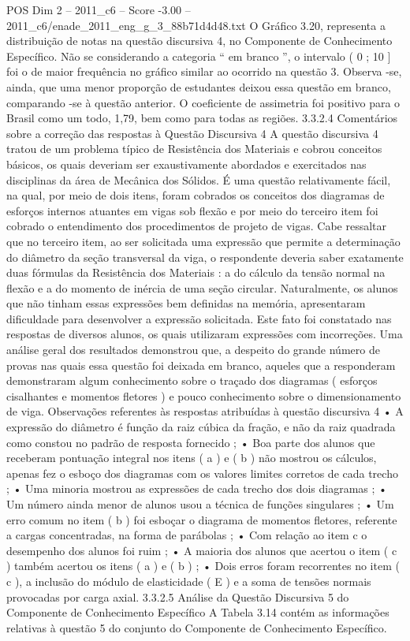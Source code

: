 \begin{textsample}{POS Dim 2 – 2011\_c6 – Score -3.00 – 2011\_c6/enade\_2011\_eng\_g\_3\_88b71d4d48.txt}
O Gráfico 3.20, representa a distribuição de notas na questão discursiva 4, no Componente de Conhecimento Específico.
Não se considerando a categoria “ em branco ”, o intervalo ( 0 ; 10 ] foi o de maior frequência no gráfico similar ao ocorrido na questão 3.
Observa -se, ainda, que uma menor proporção de estudantes deixou essa questão em branco, comparando -se à questão anterior.
O coeficiente de assimetria foi positivo para o Brasil como um todo, 1,79, bem como para todas as regiões. 3.3.2.4 Comentários sobre a correção das respostas à Questão Discursiva 4 A questão discursiva 4 tratou de um problema típico de Resistência dos Materiais e cobrou conceitos básicos, os quais deveriam ser exaustivamente abordados e exercitados nas disciplinas da área de Mecânica dos Sólidos.
É uma questão relativamente fácil, na qual, por meio de dois itens, foram cobrados os conceitos dos diagramas de esforços internos atuantes em vigas sob flexão e por meio do terceiro item foi cobrado o entendimento dos procedimentos de projeto de vigas.
Cabe ressaltar que no terceiro item, ao ser solicitada uma expressão que permite a determinação do diâmetro da seção transversal da viga, o respondente deveria saber exatamente duas fórmulas da Resistência dos Materiais : a do cálculo da tensão normal na flexão e a do momento de inércia de uma seção circular.
Naturalmente, os alunos que não tinham essas expressões bem definidas na memória, apresentaram dificuldade para desenvolver a expressão solicitada.
Este fato foi constatado nas respostas de diversos alunos, os quais utilizaram expressões com incorreções.
Uma análise geral dos resultados demonstrou que, a despeito do grande número de provas nas quais essa questão foi deixada em branco, aqueles que a responderam demonstraram algum conhecimento sobre o traçado dos diagramas ( esforços cisalhantes e momentos fletores ) e pouco conhecimento sobre o dimensionamento de viga.
Observações referentes às respostas atribuídas à questão discursiva 4 • A expressão do diâmetro é função da raiz cúbica da fração, e não da raiz quadrada como constou no padrão de resposta fornecido ; • Boa parte dos alunos que receberam pontuação integral nos itens ( a ) e ( b ) não mostrou os cálculos, apenas fez o esboço dos diagramas com os valores limites corretos de cada trecho ; • Uma minoria mostrou as expressões de cada trecho dos dois diagramas ; • Um número ainda menor de alunos usou a técnica de funções singulares ; • Um erro comum no item ( b ) foi esboçar o diagrama de momentos fletores, referente a cargas concentradas, na forma de parábolas ; • Com relação ao item c o desempenho dos alunos foi ruim ; • A maioria dos alunos que acertou o item ( c ) também acertou os itens ( a ) e ( b ) ; • Dois erros foram recorrentes no item ( c ), a inclusão do módulo de elasticidade ( E ) e a soma de tensões normais provocadas por carga axial. 3.3.2.5 Análise da Questão Discursiva 5 do Componente de Conhecimento Específico A Tabela 3.14 contém as informações relativas à questão 5 do conjunto do Componente de Conhecimento Específico.

\end{textsample}
